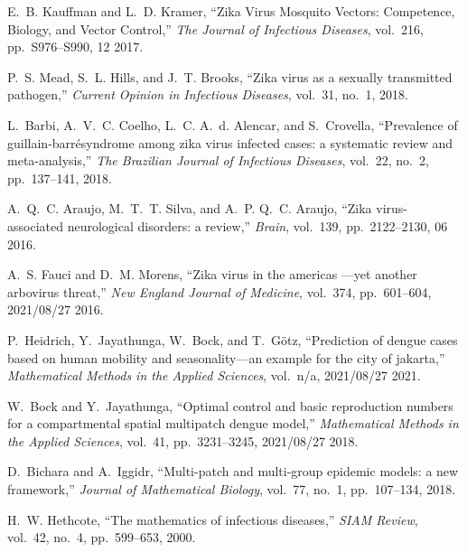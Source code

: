 \documentclass{article}
\begin{document}
%
%
% 
%

\begin{thebibliography}{1}
	
	E.~B. Kauffman and L.~D. Kramer, ``{Zika Virus Mosquito Vectors: Competence,
		Biology, and Vector Control},'' {\em The Journal of Infectious Diseases},
	vol.~216, pp.~S976--S990, 12 2017.
	
	P.~S. Mead, S.~L. Hills, and J.~T. Brooks, ``Zika virus as a sexually
	transmitted pathogen,'' {\em Current Opinion in Infectious Diseases},
	vol.~31, no.~1, 2018.
	
	L.~Barbi, A.~V.~C. Coelho, L.~C. A.~d. Alencar, and S.~Crovella, ``Prevalence
	of guillain-barr{\'e}syndrome among zika virus infected cases: a systematic
	review and meta-analysis,'' {\em The Brazilian Journal of Infectious
		Diseases}, vol.~22, no.~2, pp.~137--141, 2018.
	
	A.~Q.~C. Araujo, M.~T.~T. Silva, and A.~P. Q.~C. Araujo, ``{Zika
		virus-associated neurological disorders: a review},'' {\em Brain}, vol.~139,
	pp.~2122--2130, 06 2016.
	
	A.~S. Fauci and D.~M. Morens, ``Zika virus in the americas ---yet another
	arbovirus threat,'' {\em New England Journal of Medicine}, vol.~374,
	pp.~601--604, 2021/08/27 2016.
	
	P.~Heidrich, Y.~Jayathunga, W.~Bock, and T.~G{\"o}tz, ``Prediction of dengue
	cases based on human mobility and seasonality---an example for the city of
	jakarta,'' {\em Mathematical Methods in the Applied Sciences}, vol.~n/a,
	2021/08/27 2021.
	
	W.~Bock and Y.~Jayathunga, ``Optimal control and basic reproduction numbers for
	a compartmental spatial multipatch dengue model,'' {\em Mathematical Methods
		in the Applied Sciences}, vol.~41, pp.~3231--3245, 2021/08/27 2018.
	
	D.~Bichara and A.~Iggidr, ``Multi-patch and multi-group epidemic models: a new
	framework,'' {\em Journal of Mathematical Biology}, vol.~77, no.~1,
	pp.~107--134, 2018.
	
	H.~W. Hethcote, ``The mathematics of infectious diseases,'' {\em SIAM Review},
	vol.~42, no.~4, pp.~599--653, 2000.
	
\end{thebibliography}
\end{document}
